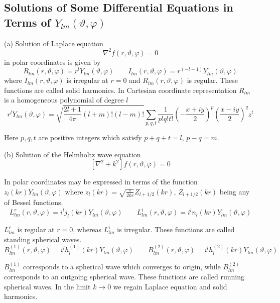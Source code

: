 \subsection[Solutions of Some Differential Equations ...]{Solutions of Some Differential Equations in Terms of $Y_{lm}(\vartheta,\varphi)$}
\par{(a) Solution of Laplace equation}
\begin{equation}
\nabla^2f(r,\vartheta,\varphi)=0
\end{equation}
in polar coordinates is given by
\begin{equation}
R_{lm}(r,\vartheta,\varphi)=r^lY_{lm}(\vartheta,\varphi)\qquad I_{lm}(r,\vartheta,\varphi)=r^{(-l-1)}Y_{lm}(\vartheta,\varphi) 
\end{equation}
where $I_{lm}(r,\vartheta,\varphi)$ is irregular at $r=0$ and
$R_{lm}(r,\vartheta,\varphi)$ is regular. These functions are called solid
harmonics. In Cartesian coordinate representation $R_{lm}$ is a homogeneous
polynomial of degree $l$
\begin{equation}
r^lY_{lm}(\vartheta,\varphi)=\sqrt{\frac{2l+1}{4\pi}(l+m)!(l-m)!}\sum_{p,q,t}\frac{1}{p!q!t!}\left(-\frac{x+iy}{2}\right)^p\left(\frac{x-iy}{2}\right)^qz^t
\end{equation}
\par{Here $p,q,t$ are positive integers which satisfy $p+q+t=l$, $p-q=m$.}
\par{(b) Solution of the Helmholtz wave equation}
\begin{equation}
\left[\nabla^2+k^2\right]f(r,\vartheta,\varphi)=0
\end{equation}
\par{In polar coordinates may be expressed in terms of the function
$z_l(kr)Y_{lm}(\vartheta,\varphi)$ where
$z_l(kr)=\sqrt{\frac{\pi}{2kr}}Z_{l+1/2}(kr)$, $Z_{l+1/2}(kr)$ being any of
Bessel functions.}
\begin{equation}
L_{lm}^{r}(r,\vartheta,\varphi)=i^lj_l(kr)Y_{lm}(\vartheta,\varphi)\qquad L_{lm}^{i}(r,\vartheta,\varphi)=i^ln_l(kr)Y_{lm}(\vartheta,\varphi) 
\end{equation}
\par{$L_{lm}^{r}$ is regular at $r=0$, whereas $L_{lm}^{i}$ is irregular. These
functions are called standing spherical waves.}
\begin{equation}
B_{lm}^{(1)}(r,\vartheta,\varphi)=i^lh_l^{(1)}(kr)Y_{lm}(\vartheta,\varphi)\qquad B_{lm}^{(2)}(r,\vartheta,\varphi)=i^lh_l^{(2)}(kr)Y_{lm}(\vartheta,\varphi) 
\end{equation}
\par {$B_{lm}^{(1)}$ corresponds to a spherical wave which converges to origin, while
$B_{lm}^{(2)}$ corresponds to an outgoing spherical wave. These functions are
called running spherical waves. In the limit $k \rightarrow 0$ we regain
Laplace equation and solid harmonics.}
